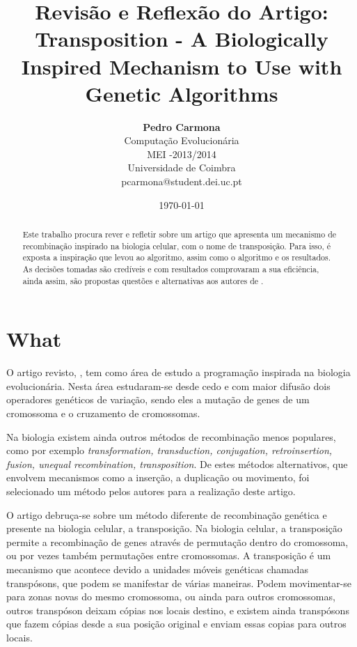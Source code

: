 \documentclass[11pt,portuguese,a4paper]{article}
\title{\LARGE{\textbf{Revisão e Reflexão do Artigo:}}\\ Transposition - A Biologically Inspired Mechanism to Use with Genetic Algorithms \cite{Simoes99transposition:a}}
\author{ \textbf{Pedro Carmona} \\ Computação Evolucionária\\ MEI -2013/2014 \\ Universidade de Coimbra \\ pcarmona@student.dei.uc.pt}
\date{\today}
\begin{document}
\maketitle

\begin{abstract}
Este trabalho procura rever e refletir sobre um artigo que apresenta um mecanismo de recombinação inspirado na biologia celular, com o nome de transposição. Para isso, é exposta a inspiração que levou ao algoritmo, assim como o algoritmo e os resultados. As decisões tomadas são credíveis e com resultados comprovaram a sua eficiência, ainda assim, são propostas questões e alternativas aos autores de \cite{Simoes99transposition:a}.
\end{abstract}

\section{What}


O artigo revisto, \cite{Simoes99transposition:a}, tem como área de estudo a programação inspirada na biologia evolucionária.
Nesta área estudaram-se desde cedo e com maior difusão dois operadores genéticos de variação, sendo eles a mutação de genes de um cromossoma e o cruzamento de cromossomas.

Na biologia existem ainda outros métodos de recombinação menos populares, como por exemplo \textit{transformation, transduction, conjugation, retroinsertion, fusion, unequal recombination, transposition}\cite{Simoes99transposition:a}. De estes métodos alternativos, que envolvem mecanismos como a inserção, a duplicação ou movimento, foi selecionado um método pelos autores para a realização deste artigo.

O artigo debruça-se sobre um método diferente de recombinação genética e presente na biologia celular, a transposição.
Na biologia celular, a transposição permite a recombinação de genes através de permutação dentro do cromossoma, ou por vezes também permutações entre cromossomas.
A transposição é um mecanismo que acontece devido a unidades móveis genéticas chamadas transpósons, que podem se manifestar de várias maneiras. Podem movimentar-se para zonas novas do mesmo cromossoma, ou ainda para outros cromossomas, outros transpóson deixam cópias nos locais destino, e existem ainda transpósons que fazem cópias desde a sua posição original e enviam essas copias para outros locais.
\end{document}
